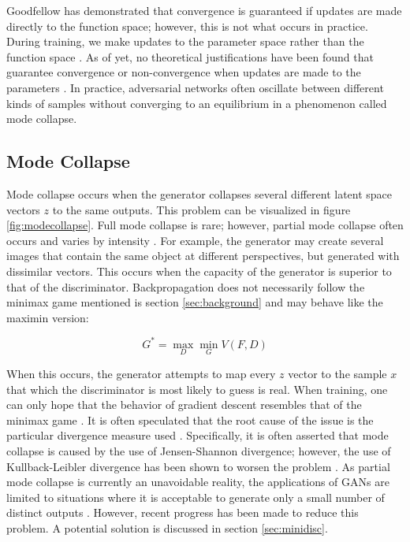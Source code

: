 \documentclass[11pt]{article}
\begin{document}
Goodfellow has demonstrated that convergence is guaranteed if updates are made directly to the function space; however, this is not what occurs in practice. During training, we make updates to the parameter space rather than the function space \citep{2014arXiv1406.2661G}. As of yet, no theoretical justifications have been found that guarantee convergence or non-convergence when updates are made to the parameters \citep{2017arXiv170100160G}. In practice, adversarial networks often oscillate between different kinds of samples without converging to an equilibrium in a phenomenon called mode collapse.

\subsection{Mode Collapse}
Mode collapse occurs when the generator collapses several different latent space vectors $z$ to the same outputs. This problem can be visualized in figure \ref{fig:modecollapse}. Full mode collapse is rare; however, partial mode collapse often occurs and varies by intensity \citep{2017arXiv170100160G}. For example, the generator may create several images that contain the same object at different perspectives, but generated with dissimilar vectors. This occurs when the capacity of the generator is superior to that of the discriminator. Backpropagation does not necessarily follow the minimax game mentioned is section \ref{sec:background} and may behave like the maximin version:

$$G^* = \max_{D}\min_{G}V(F, D)$$

When this occurs, the generator attempts to map every $z$ vector to the sample $x$ that which the discriminator is most likely to guess is real. When training, one can only hope that the behavior of gradient descent resembles that of the minimax game \citep{2017arXiv170100160G}. It is often speculated that the root cause of the issue is the particular divergence measure used \citep{2017arXiv170100160G}. Specifically, it is often asserted that mode collapse is caused by the use of Jensen-Shannon divergence; however, the use of Kullback-Leibler divergence has been shown to worsen the problem \citep{2017arXiv170100160G}. As partial mode collapse is currently an unavoidable reality, the applications of GANs are limited to situations where it is acceptable to generate only a small number of distinct outputs \citep{2017arXiv170100160G}. However, recent progress has been made to reduce this problem. A potential solution is discussed in section \ref{sec:minidisc}.
\end{document}
